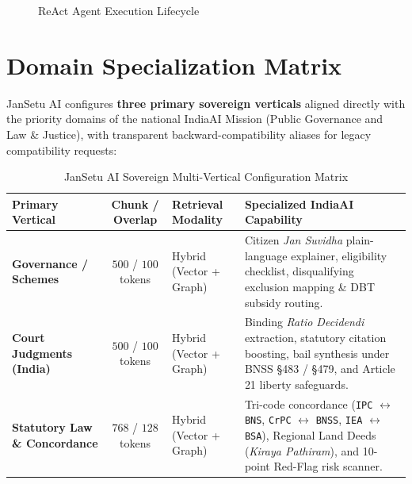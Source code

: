 \documentclass[12pt,a4paper,oneside]{report}
\begin{document}
\begin{figure}[H]
\centering
{}
\caption{ReAct Agent Execution Lifecycle}
\label{fig:react_loop}
\end{figure}

\section{Domain Specialization Matrix}
JanSetu AI configures \textbf{three primary sovereign verticals} aligned directly with the priority domains of the national IndiaAI Mission (Public Governance and Law \& Justice), with transparent backward-compatibility aliases for legacy compatibility requests:

\begin{table}[H]
\centering
\small
\caption{JanSetu AI Sovereign Multi-Vertical Configuration Matrix}
\label{tab:vertical_matrix}
\begin{tabularx}{\textwidth}{lcp{3.2cm}X}
\toprule
\textbf{Primary Vertical} & \textbf{Chunk / Overlap} & \textbf{Retrieval Modality} & \textbf{Specialized IndiaAI Capability} \\
\midrule
\textbf{Governance / Schemes} & $500$ / $100$ tokens & Hybrid (Vector + Graph) & Citizen \textit{Jan Suvidha} plain-language explainer, eligibility checklist, disqualifying exclusion mapping \& DBT subsidy routing. \\
\addlinespace
\textbf{Court Judgments (India)} & $500$ / $100$ tokens & Hybrid (Vector + Graph) & Binding \textit{Ratio Decidendi} extraction, statutory citation boosting, bail synthesis under BNSS \S 483 / \S 479, and Article 21 liberty safeguards. \\
\addlinespace
\textbf{Statutory Law \& Concordance} & $768$ / $128$ tokens & Hybrid (Vector + Graph) & Tri-code concordance (\texttt{IPC} $\leftrightarrow$ \texttt{BNS}, \texttt{CrPC} $\leftrightarrow$ \texttt{BNSS}, \texttt{IEA} $\leftrightarrow$ \texttt{BSA}), Regional Land Deeds (\textit{Kiraya Pathiram}), and 10-point Red-Flag risk scanner. \\
\bottomrule
\end{tabularx}
\end{table}
\end{document}
